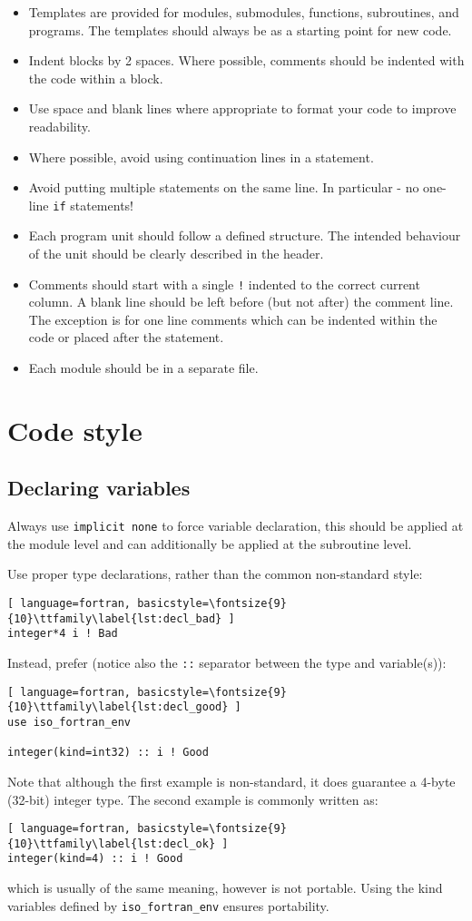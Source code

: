 \documentclass[11pt]{report}
\begin{document}
\begin{itemize}
\item Templates are provided for modules, submodules, functions, subroutines, and programs. The templates should always be as a 
starting point for new code.
\item Indent blocks by 2 spaces. Where possible, comments should be indented with the code within a block.
\item Use space and blank lines where appropriate to format your code to improve readability.
\item Where possible, avoid using continuation lines in a statement.
\item Avoid putting multiple statements on the same line. In particular - no one-line \texttt{if}
  statements!
\item Each program unit should follow a defined structure. The intended behaviour of the unit should be clearly described in the header.
\item Comments should start with a single \texttt{!} indented to the correct current column. A blank line should be left before (but not after) the 
comment line. The exception is for one line comments which can be indented within the code or placed after the statement.
\item Each module should be in a separate file.
\end{itemize}

\section{Code style}

\subsection{Declaring variables}
Always use \texttt{implicit none} to force variable declaration, this should be applied at the
module level and can additionally be applied at the subroutine level.

Use proper type declarations, rather than the common non-standard style:
\begin{lstlisting}[ language=fortran, basicstyle=\fontsize{9}{10}\ttfamily\label{lst:decl_bad} ]
integer*4 i ! Bad
\end{lstlisting}
Instead, prefer (notice also the \texttt{::} separator between the type and variable(s)):
\begin{lstlisting}[ language=fortran, basicstyle=\fontsize{9}{10}\ttfamily\label{lst:decl_good} ]
use iso_fortran_env

integer(kind=int32) :: i ! Good
\end{lstlisting}
Note that although the first example is non-standard, it does guarantee a 4-byte (32-bit) integer
type. The second example is commonly written as:
\begin{lstlisting}[ language=fortran, basicstyle=\fontsize{9}{10}\ttfamily\label{lst:decl_ok} ]
integer(kind=4) :: i ! Good
\end{lstlisting}
which is usually of the same meaning, however is not portable. Using the kind variables defined by
\texttt{iso\_fortran\_env} ensures portability.
\end{document}
